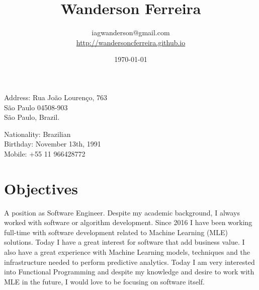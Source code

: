 \documentclass[10pt]{article}
\title{\bfseries\Huge Wanderson Ferreira}
\author{iagwanderson@gmail.com \\
\href{http://wandersoncferreira.github.io}{http://wandersoncferreira.github.io}}
\date{\today}
\begin{document}
\maketitle

\begin{center}
  \begin{minipage}{.7\textwidth}
    Address: Rua João Lourenço, 763\\
    São Paulo 04508-903\\
    São Paulo, Brazil.
  \end{minipage}%
  \begin{minipage}{.5\textwidth}
    Nationality: Brazilian\\
    Birthday: November 13th, 1991\\
    Mobile: +55 11 966428772
  \end{minipage}
\end{center}

\section*{Objectives}
A position as Software Engineer. Despite my academic background, I
always worked with software or algorithm development. Since 2016 I
have been working full-time with software development related to
Machine Learning (MLE) solutions.  Today I have a great interest for
software that add business value. I also have a great experience with
Machine Learning models, techniques and the infrastructure needed to
perform predictive analytics.  Today I am very interested into
Functional Programming and despite my knowledge and desire to work
with MLE in the future, I would love to be focusing on software
itself.
\end{document}
